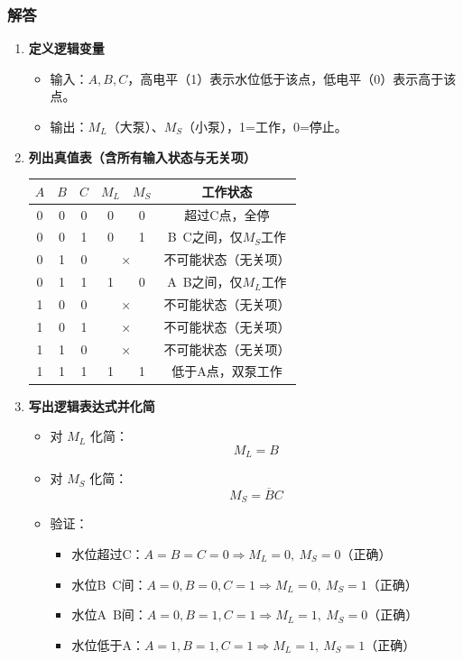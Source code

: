 \subsubsection{解答}
\begin{enumerate}
    \item \textbf{定义逻辑变量}
    \begin{itemize}
        \item 输入：$A,B,C$，高电平（1）表示水位低于该点，低电平（0）表示高于该点。
        \item 输出：$M_L$（大泵）、$M_S$（小泵），1=工作，0=停止。
    \end{itemize}

    \item \textbf{列出真值表（含所有输入状态与无关项）}
    \begin{center}
    \begin{tabular}{ccc|cc|c}
        \toprule
        $A$ & $B$ & $C$ & $M_L$ & $M_S$ & 工作状态 \\
        \midrule
        0 & 0 & 0 & 0 & 0 & 超过C点，全停 \\
        0 & 0 & 1 & 0 & 1 & B~C之间，仅$M_S$工作 \\
        0 & 1 & 0 & \multicolumn{2}{c}{×} & 不可能状态（无关项） \\
        0 & 1 & 1 & 1 & 0 & A~B之间，仅$M_L$工作 \\
        1 & 0 & 0 & \multicolumn{2}{c}{×} & 不可能状态（无关项） \\
        1 & 0 & 1 & \multicolumn{2}{c}{×} & 不可能状态（无关项） \\
        1 & 1 & 0 & \multicolumn{2}{c}{×} & 不可能状态（无关项） \\
        1 & 1 & 1 & 1 & 1 & 低于A点，双泵工作 \\
        \bottomrule
    \end{tabular}
    \end{center}

    \item \textbf{写出逻辑表达式并化简}
    \begin{itemize}
        \item 对 $M_L$ 化简：
        \[
        M_L = B
        \]
        \item 对 $M_S$ 化简：
        \[
        M_S = \overline{B}C
        \]
        \item 验证：
        \begin{itemize}
            \item 水位超过C：$A=B=C=0 \Rightarrow M_L=0,\ M_S=0$（正确）
            \item 水位B~C间：$A=0,B=0,C=1 \Rightarrow M_L=0,\ M_S=1$（正确）
            \item 水位A~B间：$A=0,B=1,C=1 \Rightarrow M_L=1,\ M_S=0$（正确）
            \item 水位低于A：$A=1,B=1,C=1 \Rightarrow M_L=1,\ M_S=1$（正确）
        \end{itemize}
    \end{itemize}


\end{enumerate}
